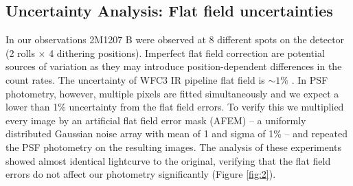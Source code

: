 \documentclass[apj]{emulateapj}
\begin{document}
\subsection{Uncertainty Analysis: Flat field uncertainties}

 \begin{figure*}
  \centering
  \caption{F125W (left) and F160W (right) light curves under different
  verification tests. Individual measurements are plotted with gray
  crosses. Photometries of the same exposure sequence are binned, and
  binned data are plotted with points and squares. Fitted sinusoidal
  waves are plotted with solid lines. {\em Upper}: binned photometries taken
in dithering position 1 and 3 (red points) and that taken in 2 and 4
(blue squares) are plotted differently. They demonstrate same trend of
variation. In upper left panel, sinusoidal wave fitted with all
parameter set free, and that fitted with period set the same as that
of F125W are plotted with green and purple lines, respectively. {\em
  Middle}: sinusoidal waves fitted without using the data taken in
Orbit 1 are plotted. These curves are almost identical to the curves
plotted in upper panel. {\em Lower}: photometry measured with
AFEM-applied images and their best fitted sinusoidal curves are
plotted. These photometries and curves are also almost identical to
those plotted in upper panel.}
  \label{fig:2}
\end{figure*}

In our observations 2M1207 B were observed at 8 different spots on the
detector (2 rolls $\times$ 4 dithering positions). Imperfect flat
field correction are potential sources of variation as they may
introduce position-dependent differences in the count rates. The
uncertainty of WFC3 IR pipeline flat field is $\sim 1\%$
\citep{dressel2012wide}.
In PSF photometry, however, multiple pixels are fitted simultaneously
and we expect a lower than 1\% uncertainty from the flat field
errors. To verify this we multiplied every image by an artificial flat
field error mask (AFEM) -- a uniformly distributed Gaussian noise array with
mean of 1 and sigma of 1\% -- and repeated the PSF photometry on the
resulting images.  The analysis of these experiments showed almost
identical lightcurve to the original, verifying that the flat field
errors do not affect our photometry significantly (Figure
\ref{fig:2}).
\end{document}
